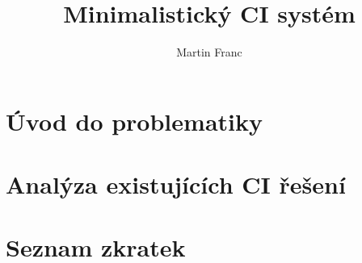 \documentclass[thesis=B,czech]{template/FITthesisXE}
\title{Minimalistický CI systém}
\author{Martin Franc}
\begin{document}

\chapter{Úvod do problematiky}



\chapter{Analýza existujících CI řešení}








\printbibliography[]

\appendix

\chapter{Seznam zkratek}
\printglossary[type=\acronymtype,style=acronyms]



\end{document}
